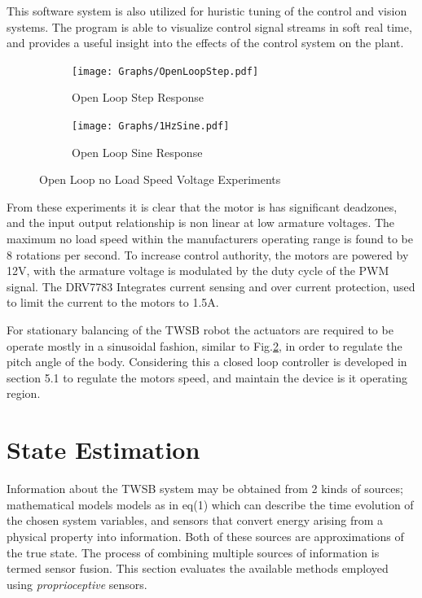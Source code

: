         This software system is also utilized for huristic tuning of the control
        and vision systems. The program is able to visualize control signal streams in soft real time, 
        and provides a useful insight into the effects of the control system on the plant.

        \begin{figure}[H]
            \centering
            \begin{subfigure}[b]{0.45\textwidth}
            \texttt{[image: Graphs/OpenLoopStep.pdf]}
            \caption{Open Loop Step Response}
            \label{fig:openstep}
            \end{subfigure}
            \hfill
            \begin{subfigure}[b]{0.45\textwidth}
            \texttt{[image: Graphs/1HzSine.pdf]}
            \caption{Open Loop Sine Response}
            \label{fig:opensine}
            \end{subfigure}
            \caption{Open Loop no Load Speed Voltage Experiments}
            \label{fig:openloop}
        \end{figure}


        From these experiments it is clear that the motor is has significant deadzones, 
        and the input output relationship is non linear at low armature voltages. 
        The maximum no load speed within the manufacturers operating range is found to be 8 rotations per second.
        To increase control authority, the motors are powered by 12V, with the armature voltage is modulated by 
        the duty cycle of the PWM signal. The DRV7783 Integrates current sensing and over current protection,
        used to limit the current to the motors to 1.5A.
       
        For stationary balancing of the TWSB robot
        the actuators are required to be operate mostly in a sinusoidal fashion, 
        similar to Fig.\ref{fig:opensine}, in order to regulate the pitch angle of the body.
        Considering this a closed loop controller is developed in section 5.1 to regulate the motors speed,
        and maintain the device is it operating region. 

    \section{State Estimation}
    Information about the TWSB system may be obtained from 2 kinds of sources; 
    mathematical models models as in eq(1) which can describe the time evolution of the chosen system variables, 
    and sensors that convert energy arising from a physical property into information. Both of these sources 
    are approximations of the true state. The process of combining multiple sources of information is termed sensor fusion.
    This section evaluates the available methods employed using \textit{proprioceptive} sensors.
